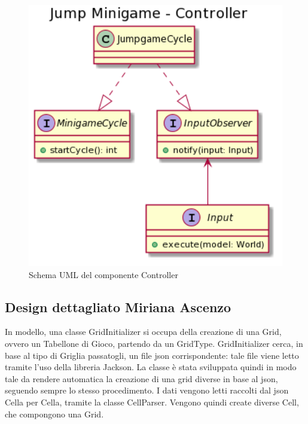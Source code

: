 \documentclass[a4paper,12pt]{report}
\begin{document}
    \begin{figure}[!t]
        \centering{}
        \includegraphics[width=150mm]{images/picchiotti/jumpcontroller.png}
        \caption{Schema UML del componente Controller}
        \label{img:jumpcontroller}
    \end{figure}

	\subsection{Design dettagliato Miriana Ascenzo}

	In modello, una classe GridInitializer si occupa della creazione di una Grid, ovvero un Tabellone di Gioco, partendo da un GridType.
	GridInitializer cerca, in base al tipo di Griglia passatogli, un file json corrispondente: tale file viene letto tramite l'uso della libreria Jackson.
	La classe è stata sviluppata quindi in modo tale da rendere automatica la creazione di una grid diverse in base al json, seguendo sempre lo stesso procedimento.
	I dati vengono letti raccolti dal json Cella per Cella, tramite la classe CellParser.
	Vengono quindi create diverse Cell, che compongono una Grid.
\end{document}
